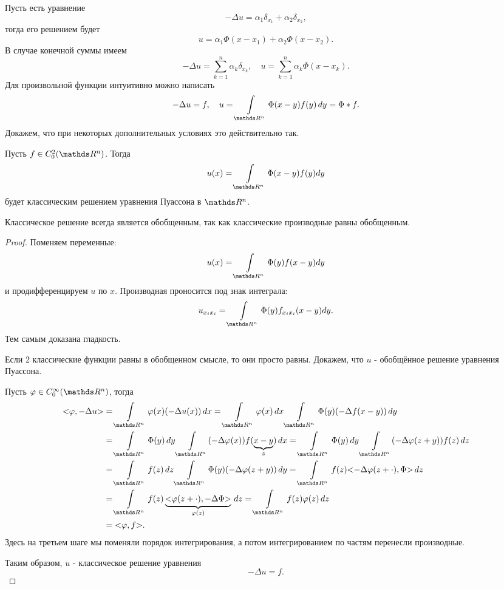 Пусть есть уравнение
$$ - \Delta u = \alpha_1 \delta_{x_1} + \alpha_2 \delta_{x_2},$$
тогда его решением будет
$$ u = \alpha_1 \Phi (x - x_1) + \alpha_2 \Phi (x - x_2).$$
В случае конечной суммы имеем
$$ - \Delta u = \sum_{k = 1}^n \alpha_k \delta_{x_k}, \quad u = \sum_{k=1}^n \alpha_k \Phi (x - x_k).$$
Для произвольной функции интуитивно можно написать
$$-\Delta u = f, \quad u = \int \limits_{\real^n} \Phi(x-y) f(y) \, dy = \Phi*f.$$
Докажем, что при некоторых дополнительных условиях это действительно так.
\begin{theorem}
Пусть $f\in C_0^2(\real^n)$. Тогда
$$ u(x) = \int\limits_{\real^n} \Phi(x-y)f(y)dy$$ будет классическим решением уравнения Пуассона в $\real^n$. 
\begin{note} Классическое решение всегда является обобщенным, так как классические производные равны обобщенным.
\end{note}
\end{theorem}
\begin{proof} Поменяем переменные:
$$u(x) = \int\limits_{\real^n}\Phi(y)f(x-y)dy$$
и продифференцируем $u$ по $x$. Производная проносится под знак интеграла:
$$u_{x_ix_i}=\int\limits_{\real^n}\Phi(y)f_{x_ix_i}(x-y)dy.$$
Тем самым доказана гладкость.

Если 2 классические функции равны в обобщенном смысле, то они просто равны. Докажем, что $u$ - обобщённое решение уравнения Пуассона.

Пусть $\varphi\in C_0^\infty(\real^n)$, тогда
\begin{align*}
\action{\varphi, -\Delta u} &= \int \limits_{\real^n} \varphi(x)(-\Delta u(x)) \, dx = \int \limits_{\real^n}\varphi(x) \, dx \int \limits_{\real^n} \Phi(y)(-\Delta f(x-y)) \, dy \\
&= \int \limits_{\real^n} \Phi(y) \, dy \int \limits_{\real^n} (-\Delta\varphi(x)) f(\underbrace{x-y}_z) \, dx = \int \limits_{\real^n} \Phi(y) \, dy \int \limits_{\real^n} (-\Delta\varphi(z+y)) f(z) \, dz \\
&= \int \limits_{\real^n} f(z) \, dz \int \limits_{\real^n} \Phi(y) (-\Delta\varphi(z+y)) \, dy = \int \limits_{\real^n} f(z) \action{-\Delta\varphi(z+\cdot), \Phi} \, dz \\
&= \int \limits_{\real^n} f(z) \underbrace{\action{\varphi(z+\cdot), -\Delta\Phi}}_{\varphi(z)} \, dz = \int\limits_{\real^n} f(z) \varphi(z) \, dz \\
& = \action{\varphi, f}.
\end{align*}
Здесь на третьем шаге мы поменяли порядок интегрирования, а потом интегрированием по частям перенесли производные.

Таким образом, $u$ - классическое решение уравнения $$-\Delta u = f.$$
\end{proof}